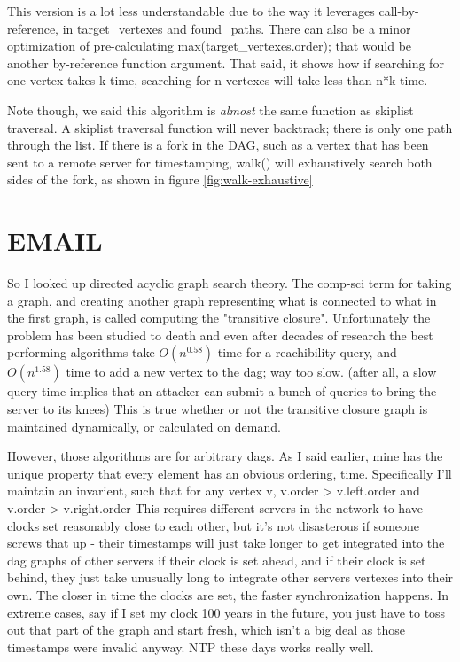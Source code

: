 \documentclass{article}
\begin{document}
This version is a lot less understandable due to the way it leverages
call-by-reference, in target\_vertexes and found\_paths. There can also be a
minor optimization of pre-calculating max(target\_vertexes.order); that would
be another by-reference function argument. That said, it shows how if searching
for one vertex takes k time, searching for n vertexes will take less than n*k
time.

Note though, we said this algorithm is \emph{almost} the same function as
skiplist traversal. A skiplist traversal function will never backtrack; there
is only one path through the list. If there is a fork in the DAG, such as a
vertex that has been sent to a remote server for timestamping, walk() will
exhaustively search both sides of the fork, as shown in figure
\ref{fig:walk-exhaustive} 





\section{EMAIL}

So I looked up directed acyclic graph search theory.
The comp-sci term for taking a graph, and creating another graph
representing what is connected to what in the first graph, is called
computing the "transitive closure". Unfortunately the problem has been
studied to death and even after decades of research the best performing
algorithms take $O(n^0.58)$ time for a reachibility query, and $O(n^1.58)$
time to add a new vertex to the dag; way too slow. (after all, a slow
query time implies that an attacker can submit a bunch of queries to
bring the server to its knees) This is true whether or not the
transitive closure graph is maintained dynamically, or calculated on
demand.

However, those algorithms are for arbitrary dags. As I said earlier,
mine has the unique property that every element has an obvious ordering,
time. Specifically I'll maintain an invarient, such that for any vertex
v, v.order > v.left.order and v.order > v.right.order This requires
different servers in the network to have clocks set reasonably close to
each other, but it's not disasterous if someone screws that up - their
timestamps will just take longer to get integrated into the dag graphs
of other servers if their clock is set ahead, and if their clock is set
behind, they just take unusually long to integrate other servers
vertexes into their own. The closer in time the clocks are set, the
faster synchronization happens. In extreme cases, say if I set my clock
100 years in the future, you just have to toss out that part of the
graph and start fresh, which isn't a big deal as those timestamps were
invalid anyway. NTP these days works really well.
\end{document}
